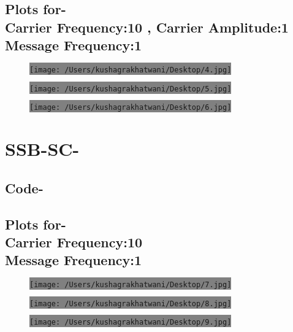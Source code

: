 \documentclass[12pt,A4paper]{article}
\begin{document}
	\subsection*{Plots for-\\
					Carrier Frequency:10 , Carrier Amplitude:1\\
					 Message Frequency:1\\}
	\begin{figure}[H]
		\centering
	\colorbox{gray}{\texttt{[image: /Users/kushagrakhatwani/Desktop/4.jpg]}}
	\end{figure}
		\begin{figure}[H]
		\centering
	\colorbox{gray}{\texttt{[image: /Users/kushagrakhatwani/Desktop/5.jpg]}}
	\end{figure}
	\begin{figure}[H]
		\centering
	\colorbox{gray}{\texttt{[image: /Users/kushagrakhatwani/Desktop/6.jpg]}}
	\end{figure}
	\section{SSB-SC-}
	\subsection*{Code-}
	
	\subsection*{Plots for-\\
					Carrier Frequency:10 \\
					 Message Frequency:1\\}
	\begin{figure}[H]
		\centering
	\colorbox{gray}{\texttt{[image: /Users/kushagrakhatwani/Desktop/7.jpg]}}
	\end{figure}
		\begin{figure}[H]
		\centering
	\colorbox{gray}{\texttt{[image: /Users/kushagrakhatwani/Desktop/8.jpg]}}
	\end{figure}
	\begin{figure}[H]
		\centering
	\colorbox{gray}{\texttt{[image: /Users/kushagrakhatwani/Desktop/9.jpg]}}
	\end{figure}
\end{document}
